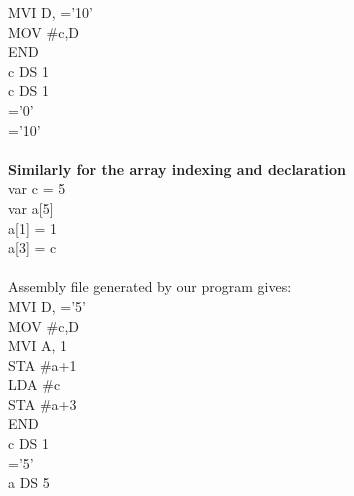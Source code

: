 \documentclass[12pt]{article}
\begin{document}
MVI D, ='10'\\
MOV \#c,D\\
END\\
c DS 1\\
c DS 1\\
='0'\\
='10'\\
\\ \textbf{Similarly for the array indexing and declaration }\\
var c = 5\\
var a[5]  \\
a[1] = 1\\
a[3] = c\\\\
Assembly file generated by our program gives:\\
MVI D, ='5'\\
MOV \#c,D\\
MVI A, 1\\
STA \#a+1\\
LDA \#c\\
STA \#a+3\\
END\\
c DS 1\\
='5'\\
a DS 5\\
\end{document}
